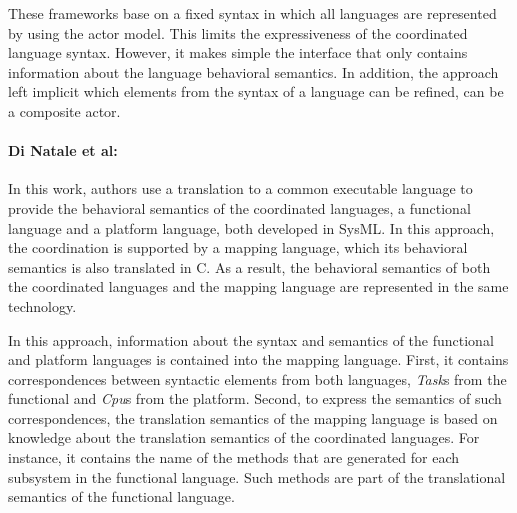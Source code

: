 These frameworks base on a fixed syntax in which all languages are represented by using the actor model. This limits the expressiveness of the coordinated language syntax. However, it makes simple the interface that only contains information about the language behavioral semantics. In addition, the approach left implicit which elements from the syntax of a language can be refined, \ie can be a composite actor.   

     

 	


\paragraph{Di Natale et al: }
In this work, authors use a translation to a common executable language to provide the behavioral semantics of the coordinated languages, \ie a functional language and a platform language, both developed in SysML. In this approach, the coordination is supported by a mapping language, which its behavioral semantics is also translated in C. As a result, the behavioral semantics of both the coordinated languages and the mapping language are represented in the same technology.

In this approach, information about the syntax and semantics of the functional and platform languages is contained into the mapping language. First, it contains correspondences between syntactic elements from both languages, \eg \emph{Task}s from the functional and \emph{Cpu}s from the platform. Second, to express the semantics of such correspondences, the translation semantics of the mapping language is based on knowledge about the translation semantics of the coordinated languages. For instance, it contains the name of the methods that are generated for each subsystem in the functional language. Such methods are part of the translational semantics of the functional language. 

